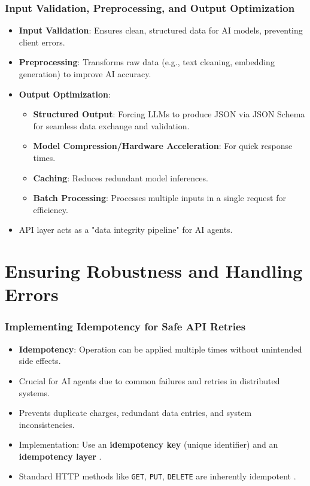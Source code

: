 \documentclass{beamer}       %
\begin{document}
\begin{frame}
    \frametitle{Input Validation, Preprocessing, and Output Optimization}
    \begin{itemize}
        \item \textbf{Input Validation}: Ensures clean, structured data for AI models, preventing client errors.
        \item \textbf{Preprocessing}: Transforms raw data (e.g., text cleaning, embedding generation) to improve AI accuracy.
        \item \textbf{Output Optimization}:
        \begin{itemize}
            \item \textbf{Structured Output}: Forcing LLMs to produce JSON via JSON Schema for seamless data exchange and validation.
            \item \textbf{Model Compression/Hardware Acceleration}: For quick response times.
            \item \textbf{Caching}: Reduces redundant model inferences.
            \item \textbf{Batch Processing}: Processes multiple inputs in a single request for efficiency.
        \end{itemize}
        \item API layer acts as a "data integrity pipeline" for AI agents.
    \end{itemize}
\end{frame}

\section{Ensuring Robustness and Handling Errors}

\begin{frame}
    \frametitle{Implementing Idempotency for Safe API Retries}
    \begin{itemize}
        \item \textbf{Idempotency}: Operation can be applied multiple times without unintended side effects.
        \item Crucial for AI agents due to common failures and retries in distributed systems.
        \item Prevents duplicate charges, redundant data entries, and system inconsistencies.
        \item Implementation: Use an \textbf{idempotency key} (unique identifier) and an \textbf{idempotency layer} .
        \item Standard HTTP methods like \texttt{GET}, \texttt{PUT}, \texttt{DELETE} are inherently idempotent .
    \end{itemize}
\end{frame}
\end{document}
